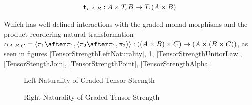 \documentclass{Report}
\begin{document}
\begin{align}
    \texttt{t}_{\epsilon, A, B}: A \times T_{\epsilon}{B} \rightarrow T_{\epsilon}{(A \times B)}
\end{align}

Which has well defined interactions with the graded monad morphisms and the product-reordering natural transformation $\alpha_{A, B, C} = \pr{\p\after\p}{\pr{\pp\after\p}{\pp}}: ((A \times B) \times C) \rightarrow (A \times (B \times C))$, as seen in figures \ref{TensorStrengthLeftNaturality}, \ref{TensorStrengthRightNaturality}, \ref{TensorStrengthUnitorLaw}, \ref{TensorStengthJoin}, \ref{TensorStrengthPoint}, \ref{TensorStrengthAlpha}.

\begin{figure}
    \centering
    \begin{minipage}{0.45\textwidth}
        \label{TensorStrengthLeftNaturality}
        \centering
            \caption{Left Naturality of Graded Tensor Strength}
    \end{minipage}
    \hfill
    \begin{minipage}{0.45\textwidth}
        \label{TensorStrengthRightNaturality}
        \centering
        \caption{Right Naturality of Graded Tensor Strength}
    \end{minipage} 
\end{figure}
\end{document}
